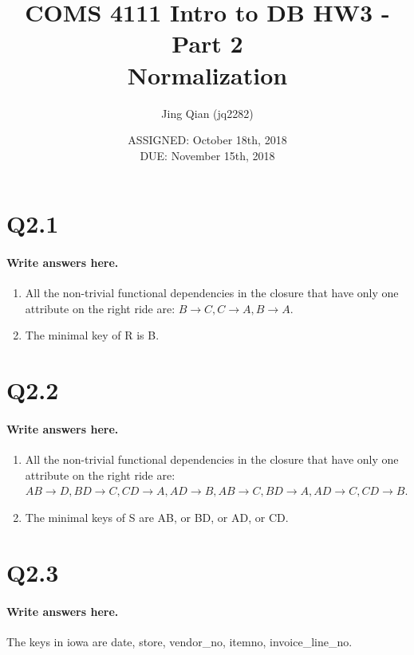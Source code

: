 \documentclass{article}
\title{COMS 4111 Intro to DB HW3 - Part 2 \\
Normalization}
\author{Jing Qian (jq2282)}
\date{ASSIGNED: October 18th, 2018 \\
DUE: November 15th, 2018}
\begin{document}
\maketitle



\pagebreak

\section*{Q2.1}
\paragraph{Write answers here.}
\begin{enumerate}[label=\alph*]
    \item All the non-trivial functional dependencies in the closure that have only one attribute on the right ride are: $B \rightarrow C, C \rightarrow A, B \rightarrow A$.
    \item The minimal key of R is B.
\end{enumerate}

\newpage

\section*{Q2.2}
\paragraph{Write answers here.}
\begin{enumerate}[label=\alph*]
    \item All the non-trivial functional dependencies in the closure that have only one attribute on the right ride are: $AB \rightarrow D, BD \rightarrow C, CD \rightarrow A, AD \rightarrow B, AB \rightarrow C, BD \rightarrow A, AD \rightarrow C, CD \rightarrow B$.
    \item The minimal keys of S are AB, or BD, or AD, or CD.
\end{enumerate}

\newpage

\section*{Q2.3}
\paragraph{Write answers here.}
The keys in iowa are date, store, vendor\_no, itemno, invoice\_line\_no.
\end{document}
